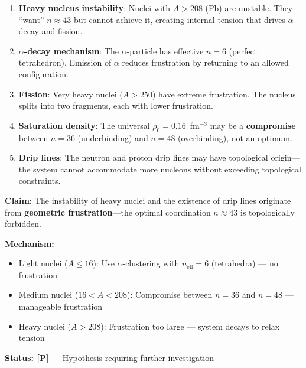 \begin{enumerate}
    \item \textbf{Heavy nucleus instability}: Nuclei with $A > 208$ (Pb) are unstable. They ``want'' $n \approx 43$ but cannot achieve it, creating internal tension that drives $\alpha$-decay and fission.

    \item \textbf{$\alpha$-decay mechanism}: The $\alpha$-particle has effective $n = 6$ (perfect tetrahedron). Emission of $\alpha$ reduces frustration by returning to an allowed configuration.

    \item \textbf{Fission}: Very heavy nuclei ($A > 250$) have extreme frustration. The nucleus splits into two fragments, each with lower frustration.

    \item \textbf{Saturation density}: The universal $\rho_0 = 0.16$~fm$^{-3}$ may be a \textbf{compromise} between $n = 36$ (underbinding) and $n = 48$ (overbinding), not an optimum.

    \item \textbf{Drip lines}: The neutron and proton drip lines may have topological origin---the system cannot accommodate more nucleons without exceeding topological constraints.
\end{enumerate}

\begin{tcolorbox}[colback=yellow!5!white, colframe=yellow!75!black, title=Hypothesis: Topological Origin of Nuclear Instability {[P]}]
\textbf{Claim:} The instability of heavy nuclei and the existence of drip lines originate from \textbf{geometric frustration}---the optimal coordination $n \approx 43$ is topologically forbidden.

\textbf{Mechanism:}
\begin{itemize}
    \item Light nuclei ($A \leq 16$): Use $\alpha$-clustering with $n_{\text{eff}} = 6$ (tetrahedra) --- no frustration
    \item Medium nuclei ($16 < A < 208$): Compromise between $n = 36$ and $n = 48$ --- manageable frustration
    \item Heavy nuclei ($A > 208$): Frustration too large --- system decays to relax tension
\end{itemize}

\textbf{Status: [P]} --- Hypothesis requiring further investigation
\end{tcolorbox}

